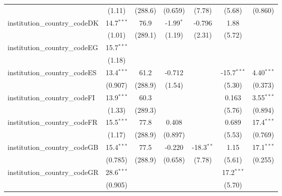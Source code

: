 \begin{tabular}{lcccccc}
                                         & (1.11)        & (288.6)      & (0.659)       & (7.78)        & (5.68)        & (0.860)\\   
   institution\_country\_codeDK          & 14.7$^{***}$  & 76.9         & -1.99$^{*}$   & -0.796        & 1.88          &   \\   
                                         & (1.01)        & (289.1)      & (1.19)        & (2.31)        & (5.72)        &   \\   
   institution\_country\_codeEG          & 15.7$^{***}$  &              &               &               &               &   \\   
                                         & (1.18)        &              &               &               &               &   \\   
   institution\_country\_codeES          & 13.4$^{***}$  & 61.2         & -0.712        &               & -15.7$^{***}$ & 4.40$^{***}$\\   
                                         & (0.907)       & (288.9)      & (1.54)        &               & (5.30)        & (0.373)\\   
   institution\_country\_codeFI          & 13.9$^{***}$  & 60.3         &               &               & 0.163         & 3.55$^{***}$\\   
                                         & (1.33)        & (289.3)      &               &               & (5.76)        & (0.894)\\   
   institution\_country\_codeFR          & 15.5$^{***}$  & 77.8         & 0.408         &               & 0.689         & 17.4$^{***}$\\   
                                         & (1.17)        & (288.9)      & (0.897)       &               & (5.53)        & (0.769)\\   
   institution\_country\_codeGB          & 15.4$^{***}$  & 77.5         & -0.220        & -18.3$^{**}$  & 1.15          & 17.1$^{***}$\\   
                                         & (0.785)       & (288.9)      & (0.658)       & (7.78)        & (5.61)        & (0.255)\\   
   institution\_country\_codeGR          & 28.6$^{***}$  &              &               &               & 17.2$^{***}$  &   \\   
                                         & (0.905)       &              &               &               & (5.70)        &   \\   

\end{tabular}
